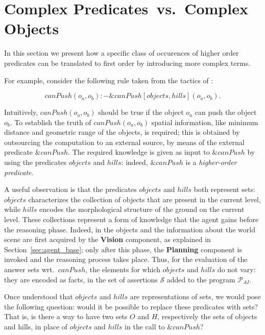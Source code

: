 \section{Complex Predicates~vs.~Complex Objects}
\label{sec:main}

In this section we present how a specific class of occurences of higher order predicates can be translated to first order by introducing more complex terms.

For example, consider the following rule taken from the tactics of \ah:


$$ canPush(o_a,o_b) :- \&canPush[objects,hills](o_a,o_b). \label{main:rule-1} $$

Intuitively, $canPush(o_a, o_b)$ should be true if the object $o_a$ can push the object $o_b$.
To establish the truth of $canPush(o_a, o_b)$ spatial information, like minimum distance and geometric range of the objects, is required; this is obtained by outsourcing the computation to an external source, by means of the external predicate $\&canPush$.
The required knowledge is given as input to $\&canPush$ by using the predicates $objects$ and $hills$: indeed, $\&canPush$ is a \emph{higher-order predicate}.

A useful observation is that the predicates $objects$ and $hills$ both represent sets: $objects$ characterizes the collection of objects that are present in the current level, while $hills$ encodes the morphological structure of the ground on the current level.
These collections represent a form of knowledge that the agent gains before the reasoning phase.
Indeed, in \ah the objects and the information about the world scene are first acquired by the \textbf{Vision} component, as explained in Section~\ref{sec:agent_base}; only after this phase, the \textbf{Planning} component is invoked and the reasoning process takes place.
Thus, for the evaluation of the answer sets wrt.~$canPush$, the elements for which $objects$ and $hills$ do not vary: they are encoded as facts, in the set of assertions \(\mathcal{S}\) added to the program \(\mathcal{P}_{AI}\).

Once understood that $objects$ and $hills$ are representations of sets, we would pose the following question: would it be possible to replace these predicates with sets?
That is, is there a way to have two sets $O$ and $H$, respectively the sets of objects and hills, in place of  $objects$ and $hills$ in the call to $\&canPush$?

